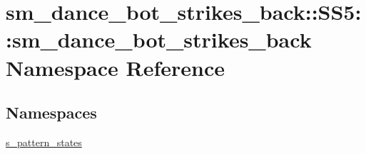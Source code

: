 \hypertarget{namespacesm__dance__bot__strikes__back_1_1SS5_1_1sm__dance__bot__strikes__back}{}\section{sm\+\_\+dance\+\_\+bot\+\_\+strikes\+\_\+back\+:\+:S\+S5\+:\+:sm\+\_\+dance\+\_\+bot\+\_\+strikes\+\_\+back Namespace Reference}
\label{namespacesm__dance__bot__strikes__back_1_1SS5_1_1sm__dance__bot__strikes__back}
\subsection*{Namespaces}
\begin{DoxyCompactItemize}
\item 
 \hyperlink{namespacesm__dance__bot__strikes__back_1_1SS5_1_1sm__dance__bot__strikes__back_1_1s__pattern__states}{s\+\_\+pattern\+\_\+states}
\end{DoxyCompactItemize}
